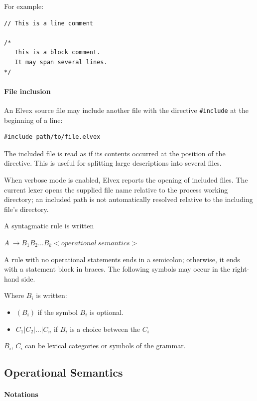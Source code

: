 \documentclass[11pt]{article}
\begin{document}
For example:

\begin{lstlisting}[numbers=none]
// This is a line comment

/*
   This is a block comment.
   It may span several lines.
*/
\end{lstlisting}

\paragraph{File inclusion}

An Elvex source file may include another file with the directive
\verb|#include| at the beginning of a line:

\begin{lstlisting}[numbers=none]
#include path/to/file.elvex
\end{lstlisting}

The included file is read as if its contents occurred at the position of
the directive.  This is useful for splitting large descriptions into several
files.

When verbose mode is enabled, Elvex reports the opening of included files.
The current lexer opens the supplied file name relative to the process working
directory; an included path is not automatically resolved relative to the
including file's directory.

A syntagmatic rule is written

$A~ \rightarrow B_1 B_2 \dots B_k <operational~semantics>$

A rule with no operational statements ends in a semicolon; otherwise, it
ends with a statement block in braces. The following symbols may occur in
the right-hand side.

Where $B_i$ is written:

\begin{itemize}
	\item $( B_i )$ if the symbol $B_i$ is optional.
	\item $C_1 | C_2 | \dots | C_n$ if $B_i$ is a choice between the $C_i$
\end{itemize}

$B_i$, $C_i$ can be lexical categories or symbols of the
grammar.

\subsection{Operational Semantics}

\paragraph{Notations}
\end{document}
